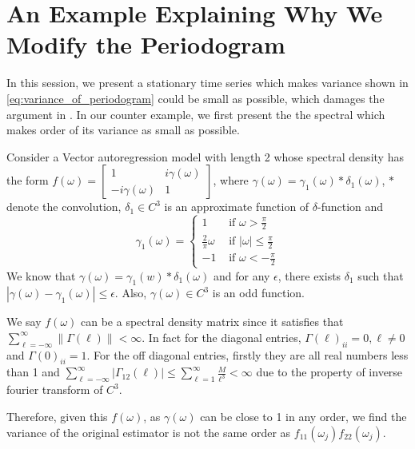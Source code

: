\section{An Example Explaining Why We Modify the Periodogram}
\label{sec:counter_example}
In this session, we present a stationary time series which makes variance shown in \eqref{eq:variance_of_periodogram} could be small as possible, which damages the argument in \cite{cai2011adaptive}. In our counter example, we first present the the spectral which makes order of its variance as small as possible. 


Consider a Vector autoregression   model with length 2 whose spectral density has the form
$f(\omega)=\begin{bmatrix}1&i\gamma(\omega)\\ -i\gamma(\omega)&1 \end{bmatrix}$, where $\gamma(\omega)=\gamma_1(\omega)*\delta_1(\omega)$, $*$ denote the convolution, $\delta_1\in C^3$ is an approximate function of $\delta$-function and  $$\gamma_1(\omega)= \begin{cases}
1 & \mbox{ if } \omega >\frac{\pi}{2}\\
\frac{2}{\pi}\omega & \mbox{ if } |\omega| \leq \frac{\pi}{2} \\
-1& \mbox{ if } \omega <-\frac{\pi}{2}
\end{cases}
$$ 
We know that $\gamma(\omega)=\gamma_1(w)*\delta_1(\omega)$ and for any $\epsilon$, there exists $\delta_1$ such that $|\gamma(\omega)-\gamma_1(\omega)|\leq \epsilon$.
Also, $\gamma (\omega)\in C^3$ is an odd function.  

We say $f(\omega)$ can be a spectral density matrix since it satisfies 
that  $\sum_{\ell=-\infty}^\infty \|\Gamma(\ell)\|<\infty$. In fact for the diagonal entries, $\Gamma(\ell)_{ii}=0,\ell \neq 0$ and  $\Gamma(0)_{ii}=1$. For the off diagonal entries, firstly they are all real numbers less than 1 and $\sum_{\ell=-\infty}^\infty |\Gamma_{12}(\ell)|\leq \sum_{\ell=1}^\infty \frac{M}{\ell^3}<\infty$ due to the property of inverse fourier transform of $C^3$.\par
Therefore, given this $f(\omega)$, as $\gamma(\omega)$ can be close to 1 in any order, we find the variance of the original estimator is not the same order as $f_{11}(\omega_j)f_{22}(\omega_j)$.